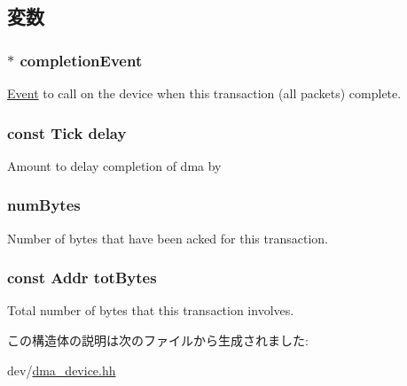 \subsection{変数}
\hypertarget{structDmaPort_1_1DmaReqState_a196ad739a618f4f20e34e1291bc5852b}{
\subsubsection[{completionEvent}]{$\ast$ {\bf completionEvent}}}
\label{structDmaPort_1_1DmaReqState_a196ad739a618f4f20e34e1291bc5852b}
\hyperlink{classEvent}{Event} to call on the device when this transaction (all packets) complete. \hypertarget{structDmaPort_1_1DmaReqState_ad3d3f34195349b5efe722fcacfb348ab}{
\subsubsection[{delay}]{\setlength{\rightskip}{0pt plus 5cm}const {\bf Tick} {\bf delay}}}
\label{structDmaPort_1_1DmaReqState_ad3d3f34195349b5efe722fcacfb348ab}
Amount to delay completion of dma by \hypertarget{structDmaPort_1_1DmaReqState_a959b63fa4a0b167ff8e0709cb82b4556}{
\subsubsection[{numBytes}]{ {\bf numBytes}}}
\label{structDmaPort_1_1DmaReqState_a959b63fa4a0b167ff8e0709cb82b4556}
Number of bytes that have been acked for this transaction. \hypertarget{structDmaPort_1_1DmaReqState_a578847bbd8b059f5f2d9a51b4fb6ce6a}{
\subsubsection[{totBytes}]{\setlength{\rightskip}{0pt plus 5cm}const {\bf Addr} {\bf totBytes}}}
\label{structDmaPort_1_1DmaReqState_a578847bbd8b059f5f2d9a51b4fb6ce6a}
Total number of bytes that this transaction involves. 

この構造体の説明は次のファイルから生成されました:\begin{DoxyCompactItemize}
\item 
dev/\hyperlink{dma__device_8hh}{dma\_\-device.hh}\end{DoxyCompactItemize}
